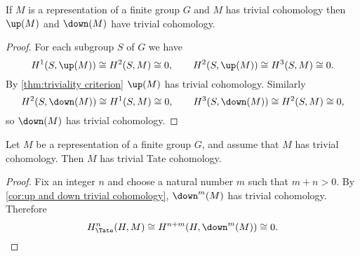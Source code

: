 \begin{corollary}	\label{cor:up and down trivial cohomology}
	If $M$ is a representation of a finite group $G$ and $M$ has trivial cohomology
	then $\up(M)$ and $\down(M)$ have trivial cohomology.
\end{corollary}

\begin{proof}
	For each subgroup $S$ of $G$ we have
	\[
		H^1(S,\up(M)) \cong H^2(S,M) \cong 0,
		\qquad
		H^2(S,\up(M)) \cong H^3(S,M) \cong 0.
	\]
	By \ref{thm:triviality criterion} $\up(M)$ has trivial cohomology.
	Similarly
	\[
		H^2(S,\down(M)) \cong H^1(S,M) \cong 0,
		\qquad
		H^3(S,\down(M)) \cong H^2(S,M) \cong 0,
	\]
	so $\down(M)$ has trivial cohomology.
\end{proof}

\begin{theorem} \label{thm:trivial cohomology implies trivial Tate}
	Let $M$ be a representation of a finite group $G$, and assume that $M$ has trivial cohomology.
	Then $M$ has trivial Tate cohomology.
\end{theorem}

\begin{proof}
	Fix an integer $n$ and choose a natural number $m$ such that $m + n > 0$.
	By \ref{cor:up and down trivial cohomology}, $\down^m(M)$ has trivial cohomology.
	Therefore
	\[
		H^n_{\Tate}(H,M) \cong H^{n+m}(H, \down^m(M)) \cong 0.
	\]
\end{proof}





